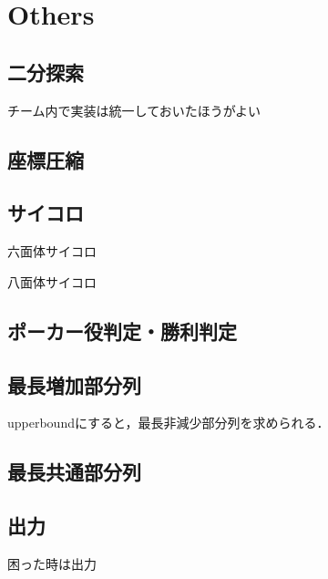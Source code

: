 \section{Others}

\subsection{二分探索}
チーム内で実装は統一しておいたほうがよい


\subsection{座標圧縮}


\subsection{サイコロ}
六面体サイコロ

八面体サイコロ


\subsection{ポーカー役判定・勝利判定}


\subsection{最長増加部分列}
upperboundにすると，最長非減少部分列を求められる．


\subsection{最長共通部分列}


\subsection{出力}
困った時は出力

